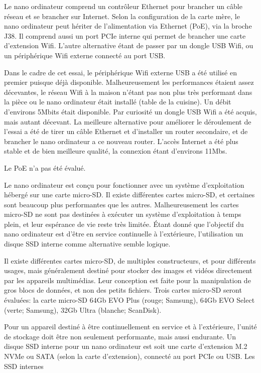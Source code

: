 \par Le nano ordinateur comprend un contrôleur Ethernet pour brancher un câble réseau et se brancher sur Internet. Selon la configuration de la carte mère, le nano ordinateur peut hériter de l'alimentation via Ethernet (PoE), via la broche J38. Il comprend aussi un port PCIe interne qui permet de brancher une carte d'extension Wifi. L'autre alternative étant de passer par un dongle USB Wifi, ou un périphérique Wifi externe connecté au port USB. 
\par Dans le cadre de cet essai, le périphérique Wifi externe USB a été utilisé en premier puisque déjà disponible. Malheureusement les performances étaient assez décevantes, le réseau Wifi à la maison n'étant pas non plus très performant dans la pièce ou le nano ordinateur était installé (table de la cuisine). Un débit d'environs 5Mbits était disponible. Par curiosité un dongle USB Wifi a été acquis, mais autant décevant. La meilleure alternative pour améliorer le déroulement de l'essai a été de tirer un câble Ethernet et d'installer un router secondaire, et de brancher le nano ordinateur a ce nouveau router. L'accès Internet a été plus stable et de bien meilleure qualité, la connexion étant d'environs 11Mbs. 
\par Le PoE n'a pas été évalué. 
\par Le nano ordinateur est conçu pour fonctionner avec un système  d'exploitation hébergé sur une carte micro-SD. Il existe différentes cartes micro-SD, et certaines sont  beaucoup plus performantes que les autres. Malheureusement les cartes micro-SD ne sont pas destinées à exécuter un système d'exploitation à temps plein, et leur espérance de vie reste très limitée.  Étant donné que l'objectif du nano ordinateur est d'être en service continuelle à l'extérieure, l'utilisation un disque SSD interne comme alternative semble logique.
\par Il existe différentes cartes micro-SD, de multiples constructeurs, et pour différents usages, mais généralement destiné pour stocker des images et vidéos directement par les appareils multimédias. Leur conception est faite pour la manipulation de gros blocs de données, et non des petits fichiers. Trois cartes micro-SD 
seront évaluées: la carte micro-SD 64Gb EVO Plus (rouge; Samsung), 64Gb EVO Select (verte; Samsung), 32Gb Ultra (blanche; ScanDisk).
\par Pour un appareil destiné à être continuellement en service et à l'extérieure, l'unité de stockage doit être non seulement performante, mais aussi endurante. Un disque SSD interne pour un nano ordinateur est soit une carte d'extension M.2 NVMe ou SATA (selon la carte d'extension), connecté au port PCIe ou USB. Les SSD internes 
